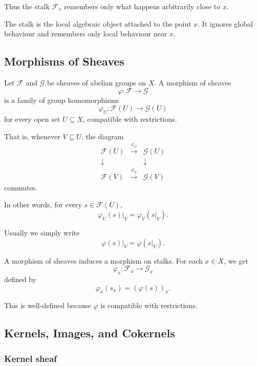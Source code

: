 Thus the stalk \(\mathcal{F}_x\) remembers only what happens arbitrarily close to \(x\).

\begin{remark}
	The stalk is the local algebraic object attached to the point \(x\). It ignores global behaviour and remembers only local behaviour near \(x\).
\end{remark}

\subsection{Morphisms of Sheaves}

\begin{definition}
	Let \(\mathcal{F}\) and \(\mathcal{G}\) be sheaves of abelian groups on \(X\). A morphism of sheaves
	\[
	\varphi:\mathcal{F}\longrightarrow \mathcal{G}
	\]
	is a family of group homomorphisms
	\[
	\varphi_U:\mathcal{F}(U)\longrightarrow \mathcal{G}(U)
	\]
	for every open set \(U\subseteq X\), compatible with restrictions.
	
	That is, whenever \(V\subseteq U\), the diagram
	\[
	\begin{array}{ccc}
		\mathcal{F}(U) & \xrightarrow{\varphi_U} & \mathcal{G}(U) \\
		\downarrow & & \downarrow \\
		\mathcal{F}(V) & \xrightarrow{\varphi_V} & \mathcal{G}(V)
	\end{array}
	\]
	commutes.
\end{definition}

In other words, for every \(s\in \mathcal{F}(U)\),
\[
\varphi_U(s)|_V=\varphi_V(s|_V).
\]

Usually we simply write
\[
\varphi(s)|_V=\varphi(s|_V).
\]

A morphism of sheaves induces a morphism on stalks. For each \(x\in X\), we get
\[
\varphi_x:\mathcal{F}_x\longrightarrow \mathcal{G}_x
\]
defined by
\[
\varphi_x(s_x)=(\varphi(s))_x.
\]

This is well-defined because \(\varphi\) is compatible with restrictions.

\subsection{Kernels, Images, and Cokernels}

\subsubsection{Kernel sheaf}


